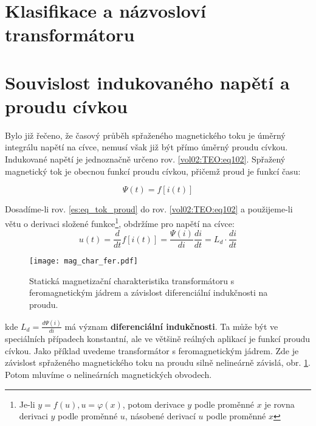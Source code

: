   \section{Klasifikace a názvosloví transformátoru}

  \section{Souvislost indukovaného napětí a proudu cívkou}
    Bylo již řečeno, že časový průběh spřaženého magnetického toku je úměrný integrálu napětí na 
    cívce, nemusí však již být přímo úměrný proudu cívkou. Indukované napětí je jednoznačně určeno 
    rov. \ref{vol02:TEO:eq102}. Spřažený magnetický tok je obecnou funkcí proudu cívkou, přičemž 
    proud je
    funkcí času:
    
    \begin{equation}\label{es:eq_tok_proud}
      \Psi(t) = f[i(t)]
    \end{equation}           

    Dosadíme-li rov. \ref{es:eq_tok_proud} do rov. \ref{vol02:TEO:eq102} a použijeme-li větu o 
    derivaci složené funkce\footnote{Je-li $y = f(u), u = \varphi(x)$, potom derivace $y$ podle 
    proměnné $x$ je rovna derivaci $y$ podle proměnné $u$, násobené derivací $u$ podle proměnné 
    $x$}, obdržíme pro napětí na cívce:
    \begin{equation}\label{es_tok_deriv}
      u(t) = \frac{d}{dt} f[i(t)] = \frac{\Psi(i)}{di} \frac{di}{dt} = L_d \cdot \frac{di}{dt}
    \end{equation}

    \begin{figure}[ht!]  %
      \centering
      \texttt{[image: mag\_char\_fer.pdf]}
      \caption{Statická magnetizační charakteristika transformátoru s feromagnetickým jádrem a 
        závislost diferenciální indukčnosti na proudu. \cite[s.~5]{Elrev2005trafo}}
      \label{es:fig_mag_char_trafa_fer}
    \end{figure}
    
    kde $L_d=\frac{d\Psi(i)}{di}$ má význam \textbf{diferenciální indukčnosti}. Ta může být ve 
    speciálních případech konstantní, ale ve většině reálných aplikací je funkcí proudu cívkou. 
    Jako příklad uvedeme transformátor s feromagnetickým jádrem. Zde je závislost spřaženého 
    magnetického toku na proudu silně nelineárně závislá, obr. \ref{es:fig_mag_char_trafa_fer}. 
    Potom mluvíme o nelineárních magnetických obvodech.


